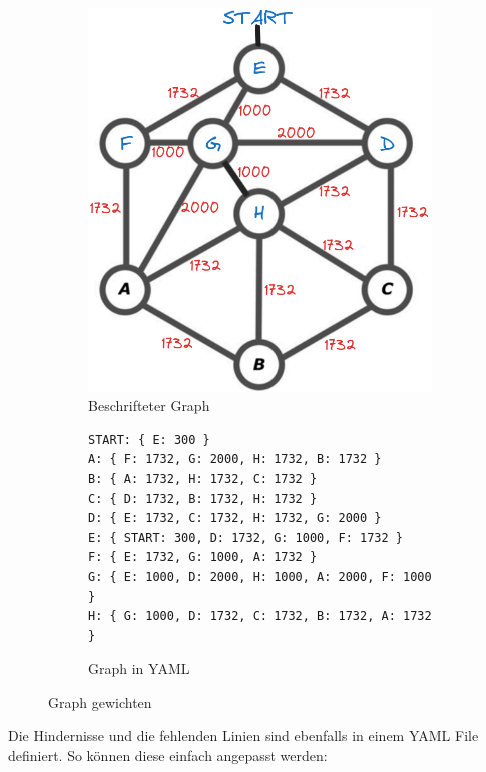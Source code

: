 \begin{figure}[H]
\centering
\begin{subfigure}{0.37\textwidth}
\centering
\includegraphics[width=0.95\linewidth]{img/graph_with_weighted_edges_1.png} 
\caption{Beschrifteter Graph}
\label{fig:labeled-graph}
\end{subfigure}
\begin{subfigure}{0.6\textwidth}
\begin{footnotesize}
\begin{verbatim}
START: { E: 300 }
A: { F: 1732, G: 2000, H: 1732, B: 1732 }
B: { A: 1732, H: 1732, C: 1732 }
C: { D: 1732, B: 1732, H: 1732 }
D: { E: 1732, C: 1732, H: 1732, G: 2000 }
E: { START: 300, D: 1732, G: 1000, F: 1732 }
F: { E: 1732, G: 1000, A: 1732 }
G: { E: 1000, D: 2000, H: 1000, A: 2000, F: 1000 }
H: { G: 1000, D: 1732, C: 1732, B: 1732, A: 1732 }
\end{verbatim}
\end{footnotesize}
\caption{Graph in YAML}
\label{fig:graph-yaml}
\end{subfigure}
\caption{Graph gewichten}
\label{fig:labeled-graph-and-yaml}
\end{figure}

Die Hindernisse und die fehlenden Linien sind ebenfalls in einem YAML File definiert. So können diese einfach angepasst werden:

